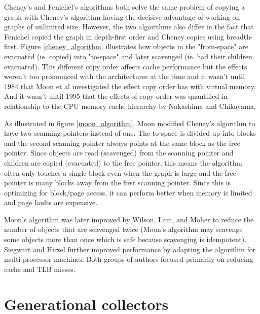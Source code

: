 \documentclass[a4paper,oneside]{memoir}
\begin{document}
Cheney's and Fenichel's algorithms both solve the same problem of copying a graph
with Cheney's algorithm having the decisive advantage of working on graphs of
unlimited size. However, the two algorithms also differ in the fact that Fenichel
copied the graph in depth-first order and Cheney copies using breadth-first.
Figure \ref{cheney_algorithm} illustrates how objects in the "from-space"
are evacuated (ie. copied) into "to-space" and later scavenged (ie. had their
children evacuated).
This
different copy order affects cache performance but the effects weren't too pronounced
with the architectures at the time and it wasn't until 1984 that Moon et al
investigated the effect copy order has with virtual memory. And it wasn't until
1995 that the effects of copy order was quantified in relationship to the
CPU memory cache hierarchy by Nakashima and Chikayama.\cite{Nakashima:1995}

As illustrated in figure \ref{moon_algorithm}, Moon modified Cheney's algorithm to have two scanning pointers instead of one.\cite{Moon:1984}
The to-space is divided up into blocks and the second scanning pointer always
points at the same block as the free pointer. Since objects are read (scavenged)
from the scanning pointer and children are copied (evacuated) to the free pointer,
this means the algorithm often only touches a single block even when the graph
is large and the free pointer is many blocks away from the first scanning pointer.
Since this is optimizing for block/page access, it can perform better when memory
is limited and page faults are expensive.

Moon's algorithm was later improved by Wilson, Lam, and Moher to reduce the
number of objects that are scavenged twice (Moon's algorithm may scavenge
some objects more than once which is safe because scavenging is idempotent).
\cite{Lam:1992}
Siegwart and Hirzel further improved performance by adapting the algorithm for
multi-processor machines.\cite{Siegwart:2006} Both groups of authors focused primarily on reducing
cache and TLB misses.

\section{Generational collectors}
\end{document}

